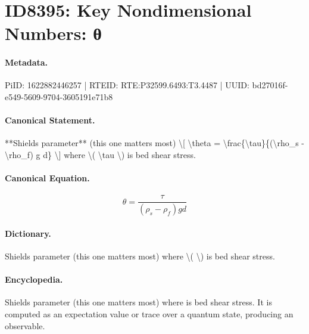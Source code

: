 \section*{ID8395: Key Nondimensional Numbers: θ}
\paragraph{Metadata.}
PiID: 1622882446257 | RTEID: RTE:P32599.6493:T3.4487 | UUID: bd27016f-e549-5609-9704-3605191e71b8

\paragraph{Canonical Statement.}
**Shields parameter** (this one matters most) \textbackslash{}[ \textbackslash{}theta = \textbackslash{}frac\{\textbackslash{}tau\}\{(\textbackslash{}rho\_s - \textbackslash{}rho\_f) g d\} \textbackslash{}] where \textbackslash{}( \textbackslash{}tau \textbackslash{}) is bed shear stress.

\paragraph{Canonical Equation.}
\[
\theta = \frac{\tau}{(\rho_s - \rho_f) g d}
\]

\paragraph{Dictionary.}
Shields parameter (this one matters most) where \textbackslash{}( \textbackslash{}) is bed shear stress.

\paragraph{Encyclopedia.}
Shields parameter (this one matters most) where is bed shear stress. It is computed as an expectation value or trace over a quantum state, producing an observable.
